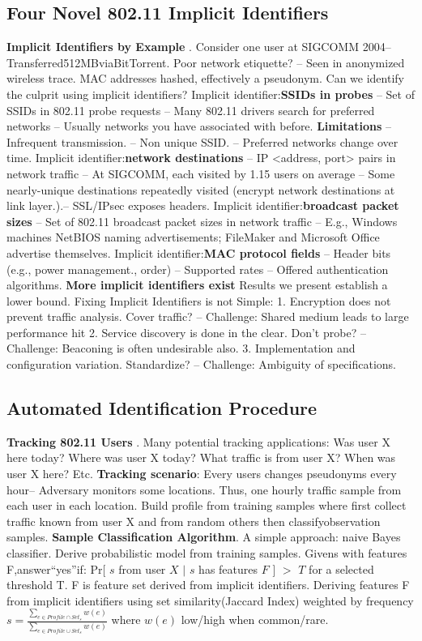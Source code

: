 \documentclass[9pt]{extarticle}
\begin{document}
\begin{multicols}{2}
\subsection{Four Novel 802.11 Implicit Identifiers}
\textbf{Implicit Identifiers by Example}
. Consider one user at SIGCOMM 2004– Transferred512MBviaBitTorrent. Poor network etiquette?
– Seen in anonymized wireless trace. MAC addresses hashed, effectively a pseudonym. Can we identify the culprit using implicit identifiers? Implicit identifier:\textbf{SSIDs in probes} – Set of SSIDs in 802.11 probe requests – Many 802.11 drivers search for preferred networks – Usually networks you have associated with before. \textbf{Limitations} – Infrequent transmission. – Non unique SSID. – Preferred networks change over time. Implicit identifier:\textbf{network destinations} – IP <address, port> pairs in network traffic – At SIGCOMM, each visited by 1.15 users on average – Some nearly-unique destinations repeatedly visited (encrypt network destinations at link layer.).– SSL/IPsec exposes headers. Implicit identifier:\textbf{broadcast packet sizes} – Set of 802.11 broadcast packet sizes in network traffic – E.g., Windows machines NetBIOS naming advertisements; FileMaker and Microsoft Office advertise themselves. Implicit identifier:\textbf{MAC protocol fields}
– Header bits (e.g., power management., order)
– Supported rates
– Offered authentication algorithms. \textbf{More implicit identifiers exist} Results we present establish a lower bound. Fixing Implicit Identifiers is not Simple: 
1. Encryption does not prevent traffic analysis. Cover traffic? – Challenge: Shared medium leads to large performance hit 2. Service discovery is done in the clear. Don’t probe? – Challenge: Beaconing is often undesirable also. 3. Implementation and configuration variation. Standardize? – Challenge: Ambiguity of specifications.

\subsection{Automated Identification Procedure}

\textbf{Tracking 802.11 Users}
. Many potential tracking applications: Was user X here today? Where was user X today? What traffic is from user X? When was user X here? Etc. \textbf{Tracking scenario}: Every users changes pseudonyms every hour– Adversary monitors some locations. Thus, one hourly traffic sample from each user in each location. Build profile from training samples where first collect traffic known from user X and from random others then classifyobservation samples. \textbf{Sample Classification Algorithm}. A simple approach: naive Bayes classifier. Derive probabilistic model from training samples. Givens with features F,answer“yes”if: Pr[ $s$ from user $X$ $|$ $s$ has features $F$ ] $>$ $T$ for a selected threshold T. F is feature set derived from implicit identifiers. Deriving features F from implicit identifiers using set similarity(Jaccard Index) weighted by frequency $s=\frac{\sum_{e\in{Profile\cap{Set_s}}}w(e)}{\sum_{e\in{Profile\cup{Set_s}}}w(e)}$ where $w(e)$ low/high when common/rare.




\end{multicols}
\end{document}
